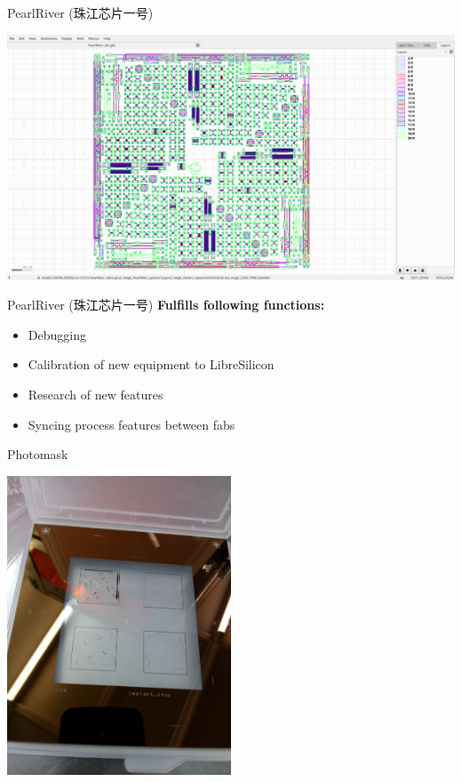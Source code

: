 \documentclass[9pt]{beamer}
\begin{document}
\begin{frame}{PearlRiver \cjkfont(珠江芯片一号)}
\begin{center}
\includegraphics[width=1.0\textwidth]{images/Screenshot_20181216_204924.png}
\end{center}
\end{frame}

\begin{frame}{PearlRiver \cjkfont(珠江芯片一号)}
	\textbf{Fulfills following functions:}
	\begin{itemize}
		\item Debugging
		\item Calibration of new equipment to LibreSilicon
		\item Research of new features
		\item Syncing process features between fabs
	\end{itemize}
\end{frame}

\begin{frame}{Photomask}
\begin{center}
\includegraphics[width=0.5\textwidth]{images/20181207_113845_Burst01.jpg}
\end{center}
\end{frame}
\end{document}
